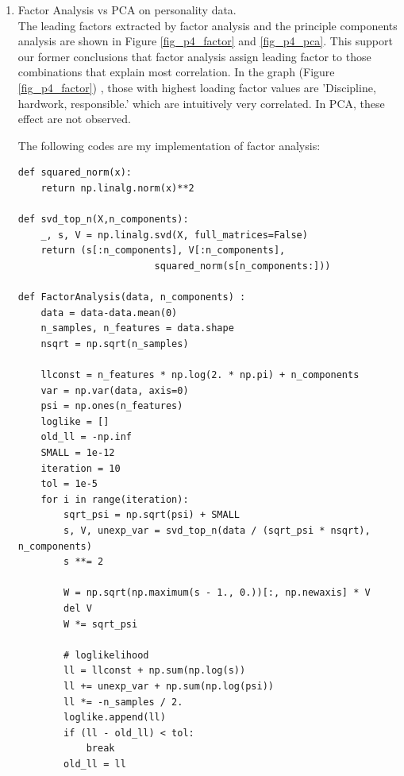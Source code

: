 \documentclass{article}
\begin{document}
\begin{enumerate}
\pagebreak
\item Factor Analysis vs PCA on personality data.\\
The leading factors extracted by  factor analysis and the principle components analysis  are shown in Figure \ref{fig_p4_factor} and \ref{fig_p4_pca}. This support our former conclusions that factor analysis assign leading factor to those combinations that explain most correlation. In the graph (Figure \ref{fig_p4_factor}) , those with highest  loading factor values are 'Discipline, hardwork, responsible.' which are intuitively very correlated. In PCA, these effect are not observed.

The following codes are my implementation of factor analysis:
\begin{verbatim}
def squared_norm(x):
    return np.linalg.norm(x)**2

def svd_top_n(X,n_components):
    _, s, V = np.linalg.svd(X, full_matrices=False)
    return (s[:n_components], V[:n_components],
                        squared_norm(s[n_components:]))

def FactorAnalysis(data, n_components) :
    data = data-data.mean(0)
    n_samples, n_features = data.shape
    nsqrt = np.sqrt(n_samples)
    
    llconst = n_features * np.log(2. * np.pi) + n_components
    var = np.var(data, axis=0)
    psi = np.ones(n_features)
    loglike = []
    old_ll = -np.inf
    SMALL = 1e-12
    iteration = 10
    tol = 1e-5
    for i in range(iteration):
        sqrt_psi = np.sqrt(psi) + SMALL
        s, V, unexp_var = svd_top_n(data / (sqrt_psi * nsqrt), n_components)
        s **= 2
        
        W = np.sqrt(np.maximum(s - 1., 0.))[:, np.newaxis] * V
        del V
        W *= sqrt_psi

        # loglikelihood
        ll = llconst + np.sum(np.log(s))
        ll += unexp_var + np.sum(np.log(psi))
        ll *= -n_samples / 2.
        loglike.append(ll)
        if (ll - old_ll) < tol:
            break
        old_ll = ll


\end{verbatim}
\end{enumerate}
\end{document}
